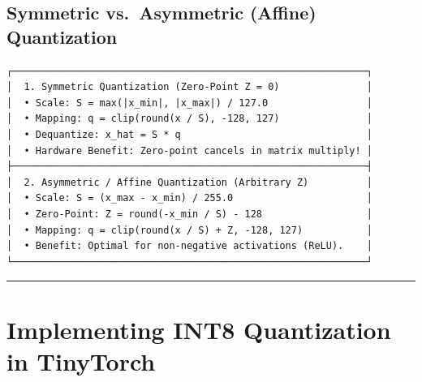 \documentclass[
  letterpaper,
]{scrbook}
\begin{document}
\subsection{Symmetric vs.~Asymmetric (Affine)
Quantization}\label{symmetric-vs.-asymmetric-affine-quantization}

\begin{verbatim}
┌─────────────────────────────────────────────────────────────┐
│  1. Symmetric Quantization (Zero-Point Z = 0)               │
│  • Scale: S = max(|x_min|, |x_max|) / 127.0                 │
│  • Mapping: q = clip(round(x / S), -128, 127)               │
│  • Dequantize: x_hat = S * q                                │
│  • Hardware Benefit: Zero-point cancels in matrix multiply! │
├─────────────────────────────────────────────────────────────┤
│  2. Asymmetric / Affine Quantization (Arbitrary Z)          │
│  • Scale: S = (x_max - x_min) / 255.0                       │
│  • Zero-Point: Z = round(-x_min / S) - 128                  │
│  • Mapping: q = clip(round(x / S) + Z, -128, 127)           │
│  • Benefit: Optimal for non-negative activations (ReLU).    │
└─────────────────────────────────────────────────────────────┘
\end{verbatim}

\begin{center}\rule{0.5\linewidth}{0.5pt}\end{center}

\section{Implementing INT8 Quantization in
TinyTorch}\label{implementing-int8-quantization-in-tinytorch}
\end{document}
